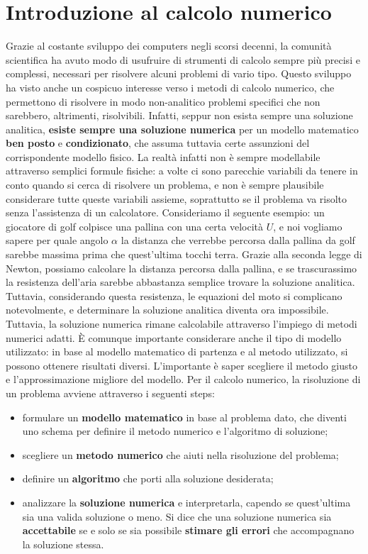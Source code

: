 \chapter{Introduzione al calcolo numerico}

Grazie al costante sviluppo dei computers negli scorsi decenni, la comunità scientifica ha avuto modo di usufruire di strumenti di calcolo sempre più precisi e complessi, necessari per risolvere alcuni problemi di vario tipo. Questo sviluppo ha visto anche un cospicuo interesse verso i metodi di calcolo numerico, che permettono di risolvere in modo non-analitico problemi specifici che non sarebbero, altrimenti, risolvibili. Infatti, seppur non esista sempre una soluzione analitica, \textbf{esiste sempre una soluzione numerica} per un modello matematico \textbf{ben posto} e \textbf{condizionato}, che assuma tuttavia certe assunzioni del corrispondente modello fisico.
\nwl
La realtà infatti non è sempre modellabile attraverso semplici formule fisiche: a volte ci sono parecchie variabili da tenere in conto quando si cerca di risolvere un problema, e non è sempre plausibile considerare tutte queste variabili assieme, soprattutto se il problema va risolto senza l'assistenza di un calcolatore. Consideriamo il seguente esempio: un giocatore di golf colpisce una pallina con una certa velocità $U$, e noi vogliamo sapere per quale angolo $\alpha$ la distanza che verrebbe percorsa dalla pallina da golf sarebbe massima prima che quest'ultima tocchi terra.
\nwl
Grazie alla seconda legge di Newton, possiamo calcolare la distanza percorsa dalla pallina, e se trascurassimo la resistenza dell'aria sarebbe abbastanza semplice trovare la soluzione analitica. Tuttavia, considerando questa resistenza, le equazioni del moto si complicano notevolmente, e determinare la soluzione analitica diventa ora impossibile. Tuttavia, la soluzione numerica rimane calcolabile attraverso l'impiego di metodi numerici adatti.
\nwl
È comunque importante considerare anche il tipo di modello utilizzato: in base al modello matematico di partenza e al metodo utilizzato, si possono ottenere risultati diversi. L'importante è saper scegliere il metodo giusto e l'approssimazione migliore del modello.
\nwl
Per il calcolo numerico, la risoluzione di un problema avviene attraverso i seguenti steps:
\begin{itemize}
    \item formulare un \textbf{modello matematico} in base al problema dato, che diventi uno schema per definire il metodo numerico e l'algoritmo di soluzione;
    \item scegliere un \textbf{metodo numerico} che aiuti nella risoluzione del problema;
    \item definire un \textbf{algoritmo} che porti alla soluzione desiderata;
    \item analizzare la \textbf{soluzione numerica} e interpretarla, capendo se quest'ultima sia una valida soluzione o meno. Si dice che una soluzione numerica sia \textbf{accettabile} se e solo se sia possibile \textbf{stimare gli errori} che accompagnano la soluzione stessa.
\end{itemize}

